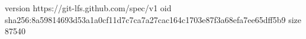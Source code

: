 version https://git-lfs.github.com/spec/v1
oid sha256:8a59814693d53a1a0cf11d7c7ca7a27cac164c1703e87f3a68efa7ee65dff5b9
size 87540
